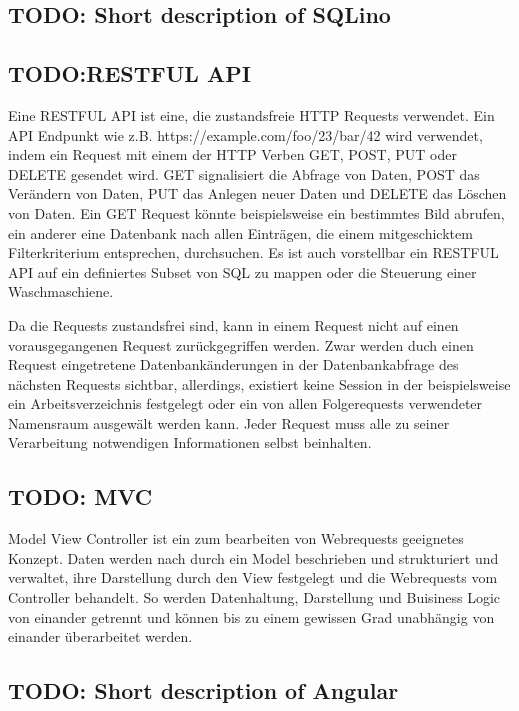 \subsection{TODO: Short description of SQLino}

\subsection{TODO:RESTFUL API}
Eine RESTFUL API ist eine, die zustandsfreie HTTP Requests verwendet. Ein API
Endpunkt wie z.B. https://example.com/foo/23/bar/42 wird verwendet, indem ein
Request mit einem der HTTP Verben GET, POST, PUT oder DELETE gesendet wird.
GET signalisiert die Abfrage von Daten, POST das Ver\"{a}ndern von Daten, PUT
das Anlegen neuer Daten und DELETE das L\"{o}schen von Daten. Ein GET Request
k\"{o}nnte beispielsweise ein bestimmtes Bild abrufen, ein anderer eine
Datenbank nach allen Eintr\"{a}gen, die einem mitgeschicktem Filterkriterium
entsprechen, durchsuchen. Es ist auch vorstellbar ein RESTFUL API auf ein
definiertes Subset von SQL zu mappen oder die Steuerung einer Waschmaschiene.

Da die Requests zustandsfrei sind, kann in einem Request nicht auf einen
vorausgegangenen Request zur\"{u}ckgegriffen werden. Zwar werden duch einen
Request eingetretene Datenbank\"{a}nderungen in der Datenbankabfrage des
n\"{a}chsten Requests sichtbar, allerdings, existiert keine Session in der
beispielsweise ein Arbeitsverzeichnis festgelegt oder ein von allen
Folgerequests verwendeter Namensraum ausgew\"{a}lt werden kann. Jeder Request
muss alle zu seiner Verarbeitung notwendigen Informationen selbst beinhalten. 

\subsection{TODO: MVC}
Model View Controller ist ein zum bearbeiten von Webrequests geeignetes Konzept.
Daten werden nach durch ein Model beschrieben und strukturiert und verwaltet, ihre Darstellung
durch den View festgelegt und die Webrequests vom Controller behandelt. So
werden Datenhaltung, Darstellung und Buisiness Logic von einander getrennt und
k\"{o}nnen bis zu einem gewissen Grad unabh\"{a}ngig von einander
\"{u}berarbeitet werden.

\subsection{TODO: Short description of Angular}

